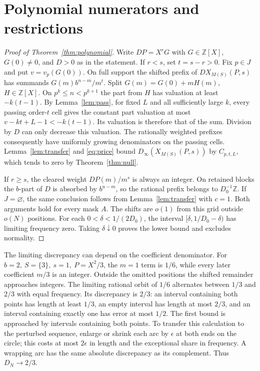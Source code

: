 \documentclass[11pt]{article}
\newcommand{\Z}{\mathbb Z}
\newcommand{\dd}{D_{\infty}}
\begin{document}
\section{Polynomial numerators and restrictions}
\begin{proof}[Proof of Theorem~\ref{thm:polynomial}]
Write \(DP=X^r G\) with \(G\in\Z[X]\), \(G(0)\ne0\), and \(D>0\) as in the statement. If \(r<s\), set \(t=s-r>0\). Fix \(p\in J\) and put \(v=v_p(G(0))\). On full support the shifted prefix of \(DX_{M(S)}(P,s)\) has summands \(G(m)b^{n-m}/m^t\). Split \(G(m)=G(0)+mH(m)\), \(H\in\Z[X]\). On \(p^k\le n<p^{k+1}\) the part from \(H\) has valuation at least \(-k(t-1)\). By Lemma~\ref{lem:pass}, for fixed \(L\) and all sufficiently large \(k\), every passing order-\(t\) cell gives the constant part valuation at most \(v-kt+L-1<-k(t-1)\). Its valuation is therefore that of the sum. Division by \(D\) can only decrease this valuation. The rationally weighted prefixes consequently have uniformly growing denominators on the passing cells. Lemma~\ref{lem:transfer} and \eqref{eq:price} bound \(\dd(X_{M(S)}(P,s))\) by \(C_{p,t,L}\), which tends to zero by Theorem~\ref{thm:null}.

If \(r\ge s\), the cleared weight \(DP(m)/m^s\) is always an integer. On retained blocks the \(b\)-part of \(D\) is absorbed by \(b^{u-m}\), so the rational prefix belongs to \(D_0^{-1}\Z\). If \(J=\varnothing\), the same conclusion follows from Lemma~\ref{lem:transfer} with \(c=1\). Both arguments hold for every mask \(A\). The shifts are \(o(1)\) from this grid outside \(o(N)\) positions. For each \(0<\delta<1/(2D_0)\), the interval \([\delta,1/D_0-\delta)\) has limiting frequency zero. Taking \(\delta\downarrow0\) proves the lower bound and excludes normality.
\end{proof}

The limiting discrepancy can depend on the coefficient denominator. For \(b=2,\ S=\{3\},\ s=1,\ P=X^2/3\), the \(m=1\) term is \(1/6\), while every later coefficient \(m/3\) is an integer. Outside the omitted positions the shifted remainder approaches integers. The limiting rational orbit of \(1/6\) alternates between \(1/3\) and \(2/3\) with equal frequency. Its discrepancy is \(2/3\): an interval containing both points has length at least \(1/3\), an empty interval has length at most \(2/3\), and an interval containing exactly one has error at most \(1/2\). The first bound is approached by intervals containing both points. To transfer this calculation to the perturbed sequence, enlarge or shrink each arc by \(\epsilon\) at both ends on the circle; this costs at most \(2\epsilon\) in length and the exceptional share in frequency. A wrapping arc has the same absolute discrepancy as its complement. Thus \(D_N\to2/3\).
\end{document}
